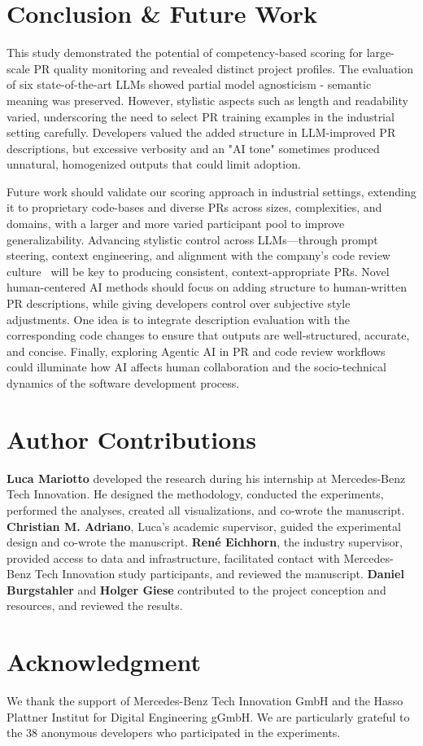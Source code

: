 \documentclass[conference]{IEEEtran}
\begin{document}
\section{Conclusion \& Future Work}\label{sec:conclusion}
This study demonstrated the potential of competency-based scoring for large-scale PR quality monitoring and revealed distinct project profiles. The evaluation of six state-of-the-art LLMs showed partial model agnosticism - semantic meaning was preserved. However, stylistic aspects such as length and readability varied, underscoring the need to select PR training examples in the industrial setting carefully. Developers valued the added structure in LLM-improved PR descriptions, but excessive verbosity and an "AI tone" sometimes produced unnatural, homogenized outputs that could limit adoption.

 Future work should validate our scoring approach in industrial settings, extending it to proprietary code-bases and diverse PRs across sizes, complexities, and domains, with a larger and more varied participant pool to improve generalizability. Advancing stylistic control across LLMs—through prompt steering, context engineering, and alignment with the company's code review culture~\cite{roychoudhury2025agentic} will be key to producing consistent, context-appropriate PRs. Novel human-centered AI methods should focus on adding structure to human-written PR descriptions,  while giving developers control over subjective style adjustments. One idea is to integrate description evaluation with the corresponding code changes to ensure that outputs are well-structured, accurate, and concise. Finally, exploring Agentic AI in PR and code review workflows~\cite{li2025rise} could illuminate how AI affects human collaboration and the socio-technical dynamics of the software development process.

\section*{Author Contributions}
\textbf{Luca Mariotto} developed the research during his internship at Mercedes-Benz Tech Innovation. He designed the methodology, conducted the experiments, performed the analyses, created all visualizations, and co-wrote the manuscript. \textbf{Christian M. Adriano}, Luca's academic supervisor, guided the experimental design and co-wrote the manuscript. \textbf{René Eichhorn}, the industry supervisor, provided access to data and infrastructure, facilitated contact with Mercedes-Benz Tech Innovation study participants, and reviewed the manuscript. \textbf{Daniel Burgstahler} and \textbf{Holger Giese} contributed to the project conception and resources, and reviewed the results.

\section*{Acknowledgment}
We thank the support of Mercedes-Benz Tech Innovation GmbH and the Hasso Plattner Institut for Digital Engineering gGmbH. We are particularly grateful to the 38 anonymous developers who participated in the experiments.


\end{document}
